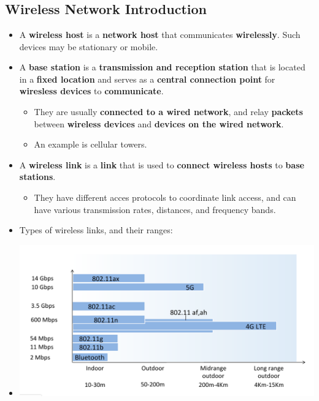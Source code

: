 \documentclass{article}
\begin{document}
    \section*{}

    \subsection*{Wireless Network Introduction}
    \begin{itemize}
        \item A \textbf{wireless host} is a \textbf{network host} that communicates \textbf{wirelessly}. Such devices may be stationary or mobile.
        \item A \textbf{base station} is a \textbf{transmission and reception station} that is located in a \textbf{fixed location} and serves as a \textbf{central connection point} for \textbf{wiresless devices} to \textbf{communicate}.
        \begin{itemize}
            \item They are usually \textbf{connected to a wired network}, and relay \textbf{packets} between \textbf{wireless devices} and \textbf{devices on the wired network}.
            \item An example is cellular towers.
        \end{itemize}
        \item A \textbf{wireless link} is a \textbf{link} that is used to \textbf{connect wireless hosts} to \textbf{base stations}.
        \begin{itemize}
            \item They have different acces protocols to coordinate link access, and can have various transmission rates, distances, and frequency bands.
        \end{itemize}
        \item Types of wireless links, and their ranges:
        \item[] \includegraphics[width=\textwidth - 25pt]{images/Wireless-Links.png}

\end{itemize}
\end{document}

